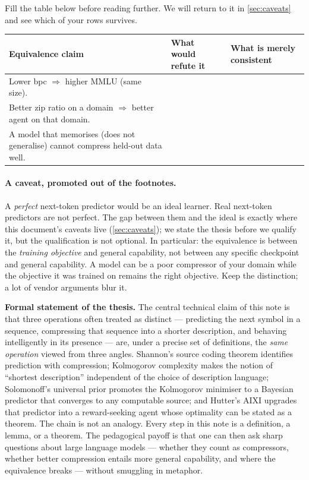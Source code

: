 \begin{activity}[title={Activity A4 --- Falsification worksheet}]
Fill the table below before reading further. We will return to it
in \cref{sec:caveats} and see which of your rows survives.
\smallskip

\begin{tabular}{p{4.2cm}p{4.2cm}p{4.2cm}}
\toprule
\textbf{Equivalence claim} & \textbf{What would refute it} & \textbf{What is merely consistent} \\
\midrule
Lower bpc $\Rightarrow$ higher MMLU (same size). & & \\
Better zip ratio on a domain $\Rightarrow$ better agent on that domain. & & \\
A model that memorises (does not generalise) cannot compress held-out data well. & & \\
\bottomrule
\end{tabular}
\end{activity}

\paragraph{A caveat, promoted out of the footnotes.}
A \emph{perfect} next-token predictor would be an ideal learner.
Real next-token predictors are not perfect. The gap between them
and the ideal is exactly where this document's caveats live
(\cref{sec:caveats}); we state the thesis before we qualify it,
but the qualification is not optional. In particular: the
equivalence is between the \emph{training objective} and general
capability, not between any specific checkpoint and general
capability. A model can be a poor compressor of your domain while
the objective it was trained on remains the right objective. Keep
the distinction; a lot of vendor arguments blur it.

\medskip
\noindent\textbf{Formal statement of the thesis.}
The central technical claim of this note is that three operations
often treated as distinct --- predicting the next symbol in a
sequence, compressing that sequence into a shorter description, and
behaving intelligently in its presence --- are, under a precise set
of definitions, the \emph{same operation} viewed from three angles.
Shannon's source coding theorem \citep{shannon1948mathematical}
identifies prediction with compression; Kolmogorov complexity
\citep{kolmogorov1965three} makes the notion of ``shortest
description'' independent of the choice of description language;
Solomonoff's universal prior \citep{solomonoff1964formal} promotes
the Kolmogorov minimiser to a Bayesian predictor that converges to
any computable source; and Hutter's AIXI
\citep{hutter2005universal} upgrades that predictor into a
reward-seeking agent whose optimality can be stated as a theorem.
The chain is not an analogy. Every step in this note is a
definition, a lemma, or a theorem. The pedagogical payoff is that
one can then ask sharp questions about large language models ---
whether they count as compressors, whether better compression
entails more general capability, and where the equivalence breaks
--- without smuggling in metaphor.
